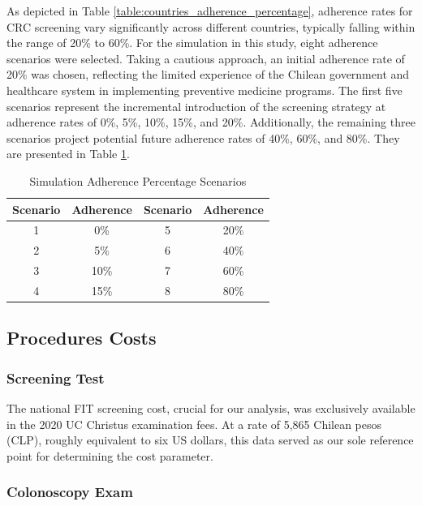 As depicted in Table \ref{table:countries_adherence_percentage}, adherence rates for CRC screening vary significantly across different countries, typically falling within the range of 20\% to 60\%. For the simulation in this study, eight adherence scenarios were selected. Taking a cautious approach, an initial adherence rate of 20\% was chosen, reflecting the limited experience of the Chilean government and healthcare system in implementing preventive medicine programs. The first five scenarios represent the incremental introduction of the screening strategy at adherence rates of 0\%, 5\%, 10\%, 15\%, and 20\%. Additionally, the remaining three scenarios project potential future adherence rates of 40\%, 60\%, and 80\%. They are presented in Table \ref{table:simulation_adherence_percentage_scenarios}.

\begin{table}[H]
\caption{Simulation Adherence Percentage Scenarios}
\centering
\begin{tabular}{|c|c|c|c|}
\hline
Scenario & Adherence & Scenario & Adherence\\ \hline
1  & 0\%  & 5 & 20\% \\ \hline
2  & 5\%  & 6 & 40\% \\ \hline
3  & 10\% & 7 & 60\% \\ \hline
4  & 15\% & 8 & 80\% \\ \hline
\end{tabular}
\label{table:simulation_adherence_percentage_scenarios}
\end{table}

\subsection{Procedures Costs}

\subsubsection*{Screening Test}

The national FIT screening cost, crucial for our analysis, was exclusively available in the 2020 UC Christus examination fees. At a rate of 5,865 Chilean pesos (CLP), roughly equivalent to six US dollars, this data served as our sole reference point for determining the cost parameter.

\subsubsection*{Colonoscopy Exam}

